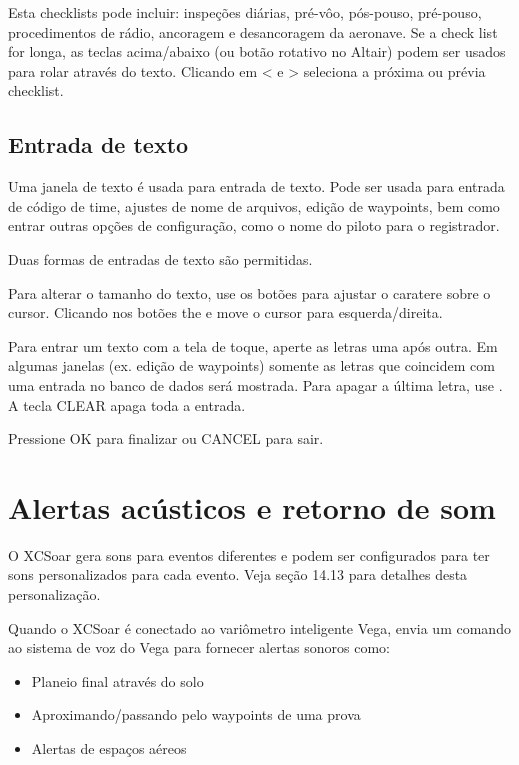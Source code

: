 Esta checklists pode incluir: inspeções diárias, pré-vôo, pós-pouso, pré-pouso, procedimentos de rádio, ancoragem e desancoragem da aeronave.
Se a check list for longa, as teclas acima/abaixo (ou botão rotativo no Altair) podem ser usados para rolar através do texto.  Clicando em < e > seleciona a próxima ou prévia checklist.



\subsection*{Entrada de texto} \label{sec:textentry}

Uma janela de texto é usada para entrada de texto.  Pode ser usada para entrada de código de time, ajustes de nome de arquivos, edição de waypoints, bem como entrar outras opções de configuração, como o nome do piloto para o registrador.

Duas formas de entradas de texto são permitidas.  

Para alterar o tamanho do texto, use os botões 
para ajustar o caratere sobre o cursor. Clicando nos botões the \button{$<$} 
e \button{$>$} move o cursor para esquerda/direita.  

Para entrar um texto com a tela de toque, aperte as letras uma após outra.  Em algumas janelas (ex. edição de waypoints) somente as letras que coincidem com uma entrada no banco de dados será mostrada.  Para apagar a última letra, use . A tecla CLEAR apaga toda a entrada.

Pressione OK para finalizar ou CANCEL para sair. 



\section{Alertas acústicos e retorno de som}

O XCSoar gera sons para eventos diferentes e podem ser configurados para ter sons personalizados para cada evento.  Veja seção 14.13 para detalhes desta personalização.

Quando o XCSoar é conectado ao variômetro inteligente Vega, envia um comando ao sistema de voz do Vega para fornecer alertas sonoros como:

\begin{itemize}
\item Planeio final através do solo
\item Aproximando/passando pelo waypoints de uma prova
\item Alertas de espaços aéreos
\end{itemize}

